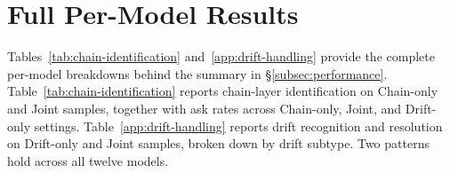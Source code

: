 \section{Full Per-Model Results}
\label{app:chain-id}

Tables~\ref{tab:chain-identification} and~\ref{app:drift-handling} provide the complete per-model breakdowns behind the summary in \S\ref{subsec:performance}. Table~\ref{tab:chain-identification} reports chain-layer identification
on Chain-only and Joint samples, together with ask rates across Chain-only, Joint, and Drift-only settings. Table~\ref{app:drift-handling} reports drift recognition and resolution on Drift-only and Joint
samples, broken down by drift subtype. Two patterns hold across all twelve models.